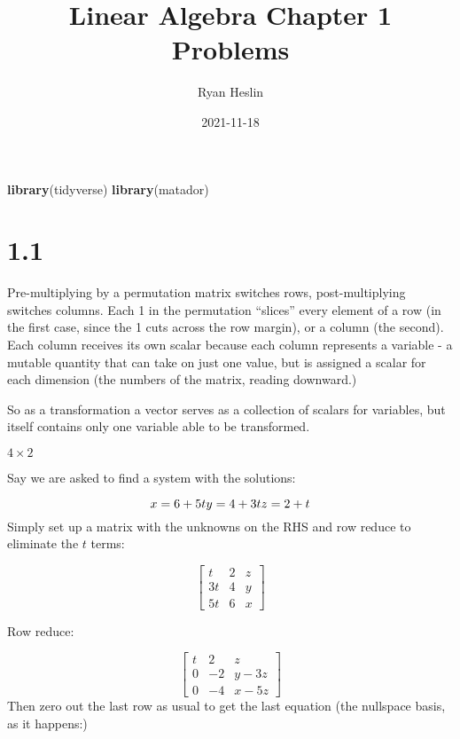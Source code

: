 \documentclass[]{article}
\title{Linear Algebra Chapter 1 Problems}
\author{Ryan Heslin}
\date{2021-11-18}
\newenvironment{Shaded}{\begin{snugshade}}{\end{snugshade}}
\newcommand{\KeywordTok}[1]{\textcolor[rgb]{0.13,0.29,0.53}{\textbf{#1}}}
\newcommand{\NormalTok}[1]{#1}
\begin{document}
\maketitle

\begin{Shaded}
\begin{Highlighting}[]
\KeywordTok{library}\NormalTok{(tidyverse)}
\KeywordTok{library}\NormalTok{(matador)}
\end{Highlighting}
\end{Shaded}

\hypertarget{section}{%
\section{1.1}\label{section}}

Pre-multiplying by a permutation matrix switches rows, post-multiplying
switches columns. Each 1 in the permutation ``slices'' every element of
a row (in the first case, since the 1 cuts across the row margin), or a
column (the second). Each column receives its own scalar because each
column represents a variable - a mutable quantity that can take on just
one value, but is assigned a scalar for each dimension (the numbers of
the matrix, reading downward.)

So as a transformation a vector serves as a collection of scalars for
variables, but itself contains only one variable able to be transformed.

\newcommand{\di}[2]{#1\times{#2}}
\newcommand{\m}[1]{\begin{bmatrix}#1\end{bmatrix}}

\(4\times{2}\)

Say we are asked to find a system with the solutions:

\[x=6+5t\\
y=4+3t\\
z=2+t\] Simply set up a matrix with the unknowns on the RHS and row
reduce to eliminate the \(t\) terms:

\[\begin{bmatrix}
t&2&z\\
3t&4&y\\
5t&6&x\end{bmatrix}\]

Row reduce:

\[\begin{bmatrix}
t&2&z\\
0&-2&y-3z\\
0&-4&x-5z\end{bmatrix}\] Then zero out the last row as usual to get the
last equation (the nullspace basis, as it happens:)
\end{document}
